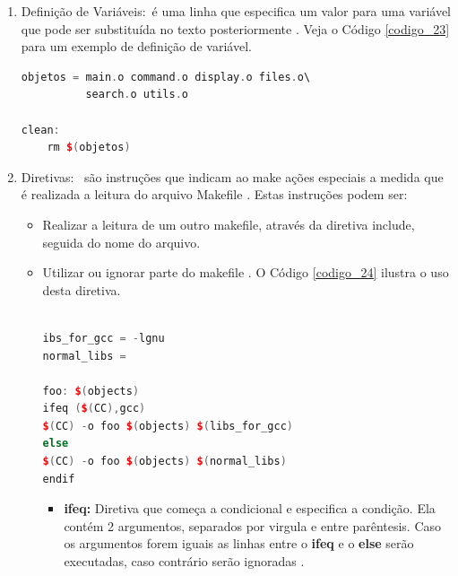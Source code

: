 \begin{enumerate}
\begin{lstlisting}[language=C++,caption={ 
                                     Utilização de padrões no makefile},
                                                        label=codigo_22]
    \end{lstlisting}


    \item Definição de Variáveis:\
 é uma linha que especifica um valor para uma variável que pode ser substituída no
 texto posteriormente \cite{ref43}. Veja o Código \ref{codigo_23} para um exemplo de 
definição de variável.

    \begin{lstlisting}[language=C++,caption={ 
                                     Definição e utilização de variável},
                                                         label=codigo_23]
objetos = main.o command.o display.o files.o\
          search.o utils.o

clean:
    rm $(objetos)
    \end{lstlisting}


    \item Diretivas: \
são instruções que indicam ao make ações especiais a medida que é realizada a leitura do
 arquivo Makefile \cite{ref43}. Estas instruções podem ser:

    \begin{itemize}
        \item Realizar a leitura de um outro makefile, através da diretiva include, seguida do nome do arquivo.
        \item Utilizar ou ignorar parte do makefile \cite{ref43}. O Código \ref{codigo_24} ilustra o uso desta diretiva. 


    \begin{lstlisting}[language=C++,caption={ 
                                      Makefile com diretiva condicional},
                                                         label=codigo_24]

ibs_for_gcc = -lgnu
normal_libs =

foo: $(objects)
ifeq ($(CC),gcc)
$(CC) -o foo $(objects) $(libs_for_gcc)
else
$(CC) -o foo $(objects) $(normal_libs)
endif

    \end{lstlisting}

    \begin{itemize}
        \item \textbf{ifeq:} Diretiva que começa a condicional e especifica a 
    condição. Ela contém 2 argumentos, separados por virgula e entre parêntesis.
     Caso os argumentos forem iguais as linhas entre o \textbf{ifeq} e o
     \textbf{else} serão executadas, caso contrário serão ignoradas \cite{ref50}.


\end{itemize}
\end{itemize}
\end{enumerate}
